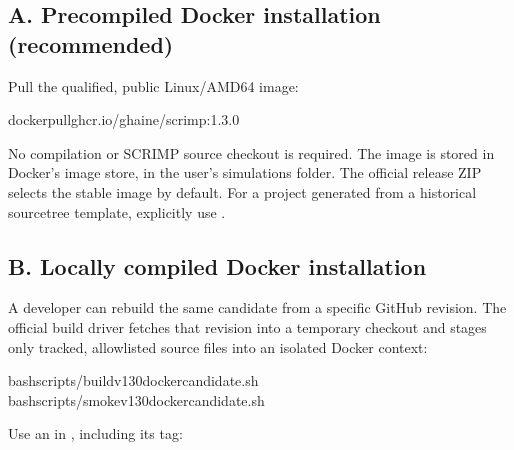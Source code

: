 \documentclass[letterpaper,10pt,english]{sphinxmanual}
\begin{document}
\subsection{A. Precompiled Docker installation (recommended)}
\label{\detokenize{vscode:a-precompiled-docker-installation-recommended}}
\sphinxAtStartPar
Pull the qualified, public Linux/AMD64 image:

\begin{sphinxVerbatim}[commandchars=\\\{\}]
dockerpullghcr.io/g\PYGZhy{}haine/scrimp:1.3.0
\end{sphinxVerbatim}

\sphinxAtStartPar
No compilation or SCRIMP source checkout is required. The image is
stored in Docker’s image store,  in the user’s simulations folder.
The official release ZIP selects the stable image by default.
For a project generated from a historical source\sphinxhyphen{}tree
template, explicitly use .


\subsection{B. Locally compiled Docker installation}
\label{\detokenize{vscode:b-locally-compiled-docker-installation}}
\sphinxAtStartPar
A developer can rebuild the same candidate from a specific GitHub
revision. The official build driver fetches that revision into a
temporary checkout and stages only tracked, allowlisted source files
into an isolated Docker context:

\begin{sphinxVerbatim}[commandchars=\\\{\}]
bashscripts/build\PYGZhy{}v130\PYGZhy{}docker\PYGZhy{}candidate.sh
bashscripts/smoke\PYGZhy{}v130\PYGZhy{}docker\PYGZhy{}candidate.sh
\end{sphinxVerbatim}

\sphinxAtStartPar
{}
Use an  in
, including its tag:

\begin{sphinxVerbatim}[commandchars=\\\{\}]
\end{sphinxVerbatim}
\end{document}

